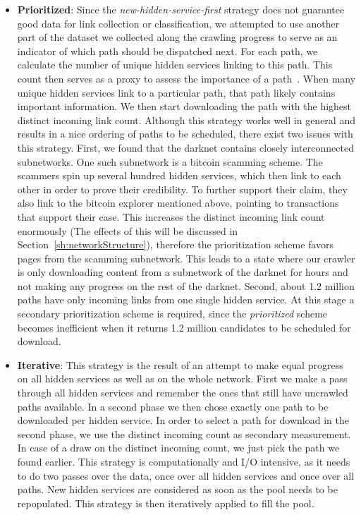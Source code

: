 \documentclass[USenglish,oneside,twocolumn]{article}
\begin{document}
\begin{itemize}
  \item \textbf{Prioritized}: Since the \emph{new-hidden-service-first} strategy does not guarantee good data for link collection or classification, we attempted to use another part of the dataset we collected along the crawling progress to serve as an indicator of which path should be dispatched next. For each path, we calculate the number of unique hidden services linking to this path. This count then serves as a proxy to assess the importance of a path~\cite{PageRank}. When many unique hidden services link to a particular path, that path likely contains important information. We then start downloading the path with the highest distinct incoming link count. Although this strategy works well in general and results in a nice ordering of paths to be scheduled, there exist two issues with this strategy. First, we found that the darknet contains closely interconnected subnetworks. One such subnetwork is a bitcoin scamming scheme. The scammers spin up several hundred hidden services, which then link to each other in order to prove their credibility. To further support their claim, they also link to the bitcoin explorer mentioned above, pointing to transactions that support their case. This increases the distinct incoming link count enormously (The effects of this will be discussed in Section~\ref{sh:networkStructure}), therefore the prioritization scheme favors pages from the scamming subnetwork. This leads to a state where our crawler is only downloading content from a subnetwork of the darknet for hours and not making any progress on the rest of the darknet. Second, about 1.2 million paths have only incoming links from one single hidden service. At this stage a secondary prioritization scheme is required, since the \emph{prioritized} scheme becomes inefficient when it returns 1.2 million candidates to be scheduled for download.
  \item \textbf{Iterative}: This strategy is the result of an attempt to make equal progress on all hidden services as well as on the whole network.  First we make a pass through all hidden services and remember the ones that still have uncrawled paths available. In a second phase we then chose exactly one path to be downloaded per hidden service. In order to select a path for download in the second phase, we use the distinct incoming count as secondary measurement. In case of a draw on the distinct incoming count, we just pick the path we found earlier. This strategy is computationally and I/O intensive, as it needs to do two passes over the data, once over all hidden services and once over all paths. New hidden services are considered as soon as the pool needs to be repopulated. This strategy is then iteratively applied to fill the pool.

\end{itemize}
\end{document}
